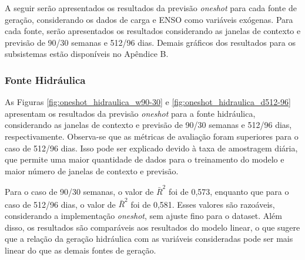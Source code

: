 A seguir serão apresentados os resultados da previsão \textit{oneshot} para cada fonte de geração, considerando os dados de carga e ENSO
como variáveis exógenas. Para cada fonte, serão apresentados os resultados considerando as janelas de contexto e previsão
de 90/30 semanas e 512/96 dias. Demais gráficos dos resultados para os subsistemas estão disponíveis no Apêndice B.

\subsubsection{Fonte Hidráulica}
\begin{figure}[!ht]
  {}
  {}
\end{figure}
\begin{figure}[!ht]
  {}
  {}
\end{figure}
As Figuras \ref{fig:oneshot_hidraulica_w90-30} e \ref{fig:oneshot_hidraulica_d512-96} apresentam os resultados da previsão
\textit{oneshot} para a fonte hidráulica, considerando as janelas de contexto e previsão de 90/30 semanas e 512/96 dias, respectivamente.
Observa-se que as métricas de avaliação foram superiores para o caso de 512/96 dias. Isso pode ser explicado devido à
taxa de amostragem diária, que permite uma maior quantidade de dados para o treinamento do modelo e maior número de 
janelas de contexto e previsão.

Para o caso de 90/30 semanas, o valor de $\bar{R}^2$ foi de 0,573, enquanto que para o caso de 512/96 dias, o valor de $\bar{R}^2$ foi de 0,581.
Esses valores são razoáveis, considerando a implementação \textit{oneshot}, sem ajuste fino para o dataset. Além disso, os
resultados são comparáveis aos resultados do modelo linear, o que sugere que a relação da geração hidráulica com as variáveis 
consideradas pode ser mais linear do que as demais fontes de geração.

